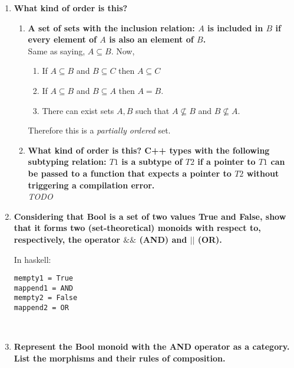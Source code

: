 \documentclass{article}
\begin{document}
\begin{enumerate}
	\item \textbf{ What kind of order is this?}
	      \begin{enumerate}
		      \item \textbf{ A set of sets with the inclusion relation: $A$ is included in $B$ if every element of $A$ is also an element of $B$.}\\
		            Same as saying, $ A \subseteq B $. Now,
		            \begin{enumerate}
			            \item If $ A \subseteq B $ and $ B \subseteq C $ then $ A \subseteq C $
			            \item If $ A \subseteq B $ 	and $ B \subseteq A $ then $ A = B $.
			            \item There can exist sets $ A , B  $ such that $ A \not \subseteq B $ and $ B \not \subseteq A $.
		            \end{enumerate}
		            Therefore this is a \textit{partially ordered} set.
		      \item \textbf{ What kind of order is this? C++ types with the following subtyping relation: $T1$ is a subtype of $T2$ if a pointer to $T1$ can be passed to a function that expects a pointer to $T2$ without triggering a compilation error.} \\
		            \textit{TODO}
	      \end{enumerate}
	\item \textbf{ Considering that Bool is a set of two values True and False, show that it forms two (set-theoretical) monoids with respect to, respectively, the operator $\&\&$ (AND) and $||$ (OR).} \\

	      In haskell: \begin{verbatim}
mempty1 = True
mappend1 = AND 
mempty2 = False
mappend2 = OR
\end{verbatim}
	      \
	\item \textbf{ Represent the Bool monoid with the AND operator as a category. List the morphisms and their rules of composition.}


\end{enumerate}
\end{document}
